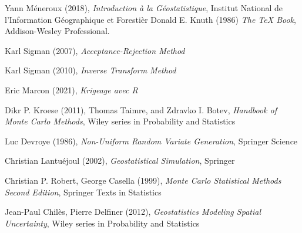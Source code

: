 \documentclass[10pt]{article} %
\begin{document}
\newpage

\begin{thebibliography}{9}
    Yann Méneroux (2018), \emph{Introduction à la Géostatistique}, Institut National de l'Information Géographique et Forestièr
    Donald E. Knuth (1986) \emph{The \TeX{} Book}, Addison-Wesley Professional.

    Karl Sigman (2007), \emph{Acceptance-Rejection Method}

    Karl Sigman (2010), \emph{Inverse Transform Method}

    Eric Marcon (2021), \emph{Krigeage avec R}

    Dikr P. Kroese (2011), Thomas Taimre, and Zdravko I. Botev, \emph{Handbook of Monte Carlo Methods}, Wiley series in Probability and Statistics

    Luc Devroye (1986), \emph{Non-Uniform Random Variate Generation}, Springer Science

    Christian Lantuéjoul (2002), \emph{Geostatistical Simulation}, Springer

    Christian P. Robert, George Casella (1999), \emph{Monte Carlo Statistical Methods Second Edition}, Springer Texts in Statistics

    Jean-Paul Chilès, Pierre Delfiner (2012), \emph{Geostatistics Modeling Spatial Uncertainty}, Wiley series in Probability and Statistics

    \end{thebibliography}
\end{document}
